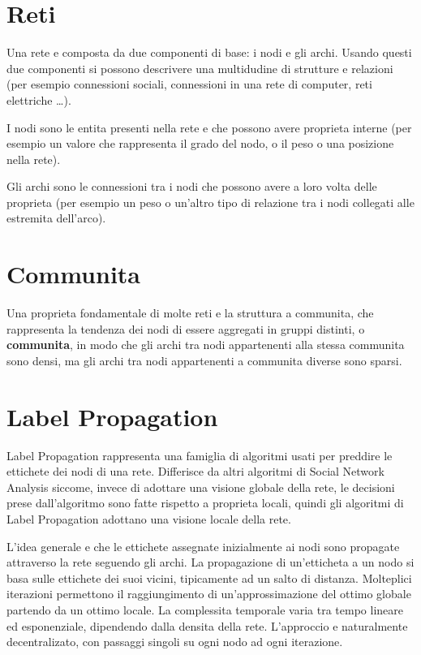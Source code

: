 \documentclass[a4paper,12pt]{report}
\begin{document}
	\section{Reti}
	Una rete e composta da due componenti di base: i nodi e gli archi. Usando questi due componenti si possono descrivere una multidudine di strutture e relazioni (per esempio connessioni sociali, connessioni in una rete di computer, reti elettriche \dots). 

	 I nodi sono le entita presenti nella rete e che possono avere proprieta interne (per esempio un valore che rappresenta il grado del nodo, o il peso o una posizione nella rete). 

	Gli archi sono le connessioni tra i nodi che possono avere a loro volta delle proprieta (per esempio un peso o un'altro tipo di relazione tra i nodi collegati alle estremita dell'arco).	\cite{snaintro} 

	\section{Communita}
	Una proprieta fondamentale di molte reti e la struttura a communita, che rappresenta la tendenza dei nodi di essere aggregati in gruppi distinti, o \textbf{communita}, in modo che gli archi tra nodi appartenenti alla stessa communita sono densi, ma gli archi tra nodi appartenenti a communita diverse sono sparsi. \cite{gregory}

	\section{Label Propagation}
	Label Propagation rappresenta una famiglia di algoritmi usati per preddire le ettichete dei nodi di una rete. 
	Differisce da altri algoritmi di Social Network Analysis siccome, invece di adottare una visione globale della rete, le decisioni prese dall'algoritmo sono fatte rispetto a proprieta locali, quindi gli algoritmi di Label Propagation adottano una visione locale della rete. \cite{raghavan} 

	L'idea generale e che le ettichete assegnate inizialmente ai nodi sono propagate attraverso la rete seguendo gli archi. La propagazione di un'etticheta a un nodo si basa sulle ettichete dei suoi vicini, tipicamente ad un salto di distanza. Molteplici iterazioni permettono il raggiungimento di un'approssimazione del ottimo globale partendo da un ottimo locale. La complessita temporale varia tra tempo lineare ed esponenziale, dipendendo dalla densita della rete. L'approccio e naturalmente decentralizato, con passaggi singoli su ogni nodo ad ogni iterazione. \cite{avpra}
	
\end{document}
